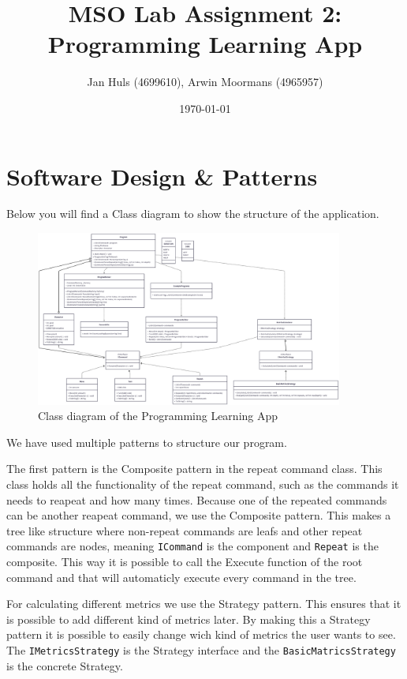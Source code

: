 \documentclass[11pt,a4paper]{article}
\date{\monthyear\today}
\title{\textbf{MSO Lab Assignment 2:\\
Programming Learning App}}
\author{Jan Huls (4699610), Arwin Moormans (4965957)}
\begin{document}
\maketitle
\section*{Software Design \& Patterns}
Below you will find a Class diagram to show the structure of the application.

\begin{figure}[htbp]\label{fig:class-diagram}
  \centering
  \includegraphics[width=0.9\textwidth]{class_diagram.png}
  \caption{Class diagram of the Programming Learning App}
\end{figure}
We have used multiple patterns to structure our program. 

The first pattern is the Composite pattern in the repeat command class.
This class holds all the functionality of the repeat command, such as the commands it needs to reapeat and how many times.
Because one of the repeated commands can be another reapeat command, we use the Composite pattern.
This makes a tree like structure where non-repeat commands are leafs and other repeat commands are nodes, meaning \texttt{ICommand} is the component and \texttt{Repeat} is the composite.
This way it is possible to call the Execute function of the root command and that will automaticly execute every command in the tree.

For calculating different metrics we use the Strategy pattern.
This ensures that it is possible to add different kind of metrics later.
By making this a Strategy pattern it is possible to easily change wich kind of metrics the user wants to see.
The \texttt{IMetricsStrategy} is the Strategy interface and the \texttt{BasicMatricsStrategy} is the concrete Strategy.
\end{document}
